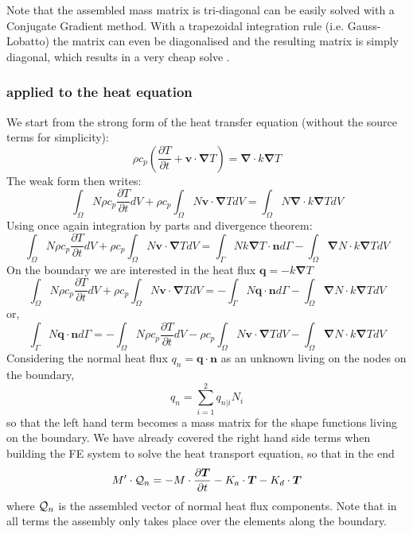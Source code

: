 Note that the assembled mass matrix is tri-diagonal can be easily solved with 
a Conjugate Gradient method. With a trapezoidal integration rule 
(i.e. Gauss-Lobatto) the matrix can even be diagonalised and the resulting 
matrix is simply diagonal, which results in a very cheap solve \cite{zhgh93}.

\subsubsection{applied to the heat equation}
We start from the strong form of the heat transfer equation (without the source terms for simplicity):
\[
\rho c_p
\left(\frac{\partial T}{\partial t} + {\bm v}\cdot {\bm \nabla}T\right)
=
{\bm \nabla} \cdot k{\bm \nabla T}
\]
The weak form then writes:
\[
\int_\Omega N
\rho c_p
\frac{\partial T}{\partial t} dV 
+
\rho c_p
\int_\Omega N
 {\bm v}\cdot {\bm \nabla}T  dV
=
\int_\Omega N
{\bm \nabla} \cdot k{\bm \nabla T} dV
\]
Using once again integration by parts and divergence theorem:
\[
\int_\Omega N
\rho c_p
\frac{\partial T}{\partial t} dV 
+
\rho c_p
\int_\Omega N
 {\bm v}\cdot {\bm \nabla}T  dV
=
\int_\Gamma N k {\bm \nabla T} \cdot {\bm n} d\Gamma
-
\int_\Omega  {\bm \nabla} N \cdot k{\bm \nabla T} dV
\]
On the boundary we are interested in the heat flux ${\bm q}=-k {\bm \nabla T}$
\[
\int_\Omega N
\rho c_p
\frac{\partial T}{\partial t} dV 
+
\rho c_p
\int_\Omega N
 {\bm v}\cdot {\bm \nabla}T  dV
=
-\int_\Gamma N {\bm q} \cdot {\bm n} d\Gamma
- \int_\Omega  {\bm \nabla} N \cdot k{\bm \nabla T} dV
\]
or,
\[
\int_\Gamma N {\bm q} \cdot {\bm n} d\Gamma
=
-\int_\Omega N
\rho c_p
\frac{\partial T}{\partial t} dV 
-\rho c_p
\int_\Omega N
 {\bm v}\cdot {\bm \nabla}T  dV
- \int_\Omega  {\bm \nabla} N \cdot k{\bm \nabla T} dV
\]
Considering the normal heat flux $q_n = {\bm q} \cdot {\bm n}$ as an unknown 
living on the nodes on the boundary, 
\[
q_n = \sum_{i=1}^2 q_{n|i} N_i
\]
so that the left hand term becomes a mass matrix for the shape functions living on 
the boundary.
We have already covered the right hand side terms when building the FE system 
to solve the heat transport equation, so that in the end 
\[
M' \cdot {\cal Q}_n =
- M \cdot \frac{\partial \bm T}{\partial t} -K_a \cdot {\bm T} - K_d \cdot {\bm T} 
\]
where ${\cal Q}_n$ is the assembled vector of normal heat flux components.
Note that in all terms the assembly only takes place over the elements along the boundary.


